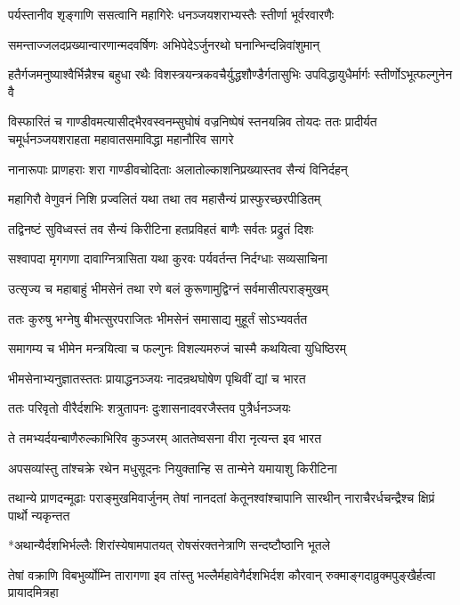 \twolineshloka
{पर्यस्तानीव शृङ्गाणि ससत्वानि महागिरेः}
{धनञ्जयशराभ्यस्तैः स्तीर्णा भूर्वरवारणैः}


\twolineshloka
{समन्ताज्जलदप्रख्यान्वारणान्मदवर्षिणः}
{अभिपेदेऽर्जुनरथो घनान्भिन्दन्निवांशुमान्}


\threelineshloka
{हतैर्गजमनुष्याश्वैर्भिन्नैश्च बहुधा रथैः}
{विशस्त्रयन्त्रकवचैर्युद्धशौण्डैर्गतासुभिः}
{उपविद्धायुधैर्मार्गः स्तीर्णोऽभूत्फल्गुनेन वै}


विस्फारितं च गाण्डीवमत्यासीद्भैरवस्वनम्सुघोषं वज्रनिष्पेषं स्तनयन्निव तोयदः
\twolineshloka
{ततः प्रादीर्यत चमूर्धनञ्जयशराहता}
{महावातसमाविद्धा महानौरिव सागरे}


\twolineshloka
{नानारूपाः प्राणहराः शरा गाण्डीवचोदिताः}
{अलातोल्काशनिप्रख्यास्तव सैन्यं विनिर्दहन्}


\twolineshloka
{महागिरौ वेणुवनं निशि प्रज्वलितं यथा}
{तथा तव महासैन्यं प्रास्फुरच्छरपीडितम्}


\twolineshloka
{तद्विनष्टं सुविध्वस्तं तव सैन्यं किरीटिना}
{हतप्रविहतं बाणैः सर्वतः प्रद्रुतं दिशः}


\twolineshloka
{सश्वापदा मृगगणा दावाग्नित्रासिता यथा}
{कुरवः पर्यवर्तन्त निर्दग्धाः सव्यसाचिना}


\twolineshloka
{उत्सृज्य च महाबाहुं भीमसेनं तथा रणे}
{बलं कुरूणामुद्विग्नं सर्वमासीत्पराङ्मुखम्}


\twolineshloka
{ततः कुरुषु भग्नेषु बीभत्सुरपराजितः}
{भीमसेनं समासाद्य मुहूर्तं सोऽभ्यवर्तत}


\twolineshloka
{समागम्य च भीमेन मन्त्रयित्वा च फल्गुनः}
{विशल्यमरुजं चास्मै कथयित्वा युधिष्ठिरम्}


\twolineshloka
{भीमसेनाभ्यनुज्ञातस्ततः प्रायाद्धनञ्जयः}
{नादन्रथघोषेण पृथिवीं द्यां च भारत}


\twolineshloka
{ततः परिवृतो वीरैर्दशभिः शत्रुतापनः}
{दुःशासनादवरजैस्तव पुत्रैर्धनञ्जयः}


\twolineshloka
{ते तमभ्यर्दयन्बाणैरुल्काभिरिव कुञ्जरम्}
{आततेष्वसना वीरा नृत्यन्त इव भारत}


\twolineshloka
{अपसव्यांस्तु तांश्चक्रे रथेन मधुसूदनः}
{नियुक्तान्हि स तान्मेने यमायाशु किरीटिना}


तथान्ये प्राणदन्मूढाः पराङ्मुखमिवार्जुनम्
\twolineshloka
{तेषां नानदतां केतूनश्वांश्चापानि सारथीन्}
{नाराचैरर्धचन्द्रैश्च क्षिप्रं पार्थो न्यकृन्तत}


\twolineshloka
{*अथान्यैर्दशभिर्भल्लैः शिरांस्येषामपातयत्}
{रोषसंरक्तनेत्राणि सन्दष्टौष्ठानि भूतले}


तेषां वक्राणि विबभुर्व्योम्नि तारागणा इव
\twolineshloka
{तांस्तु भल्लैर्महावेगैर्दशभिर्दश कौरवान्}
{रुक्माङ्गदाव्रुक्मपुङ्खैर्हत्वा प्रायादमित्रहा}


